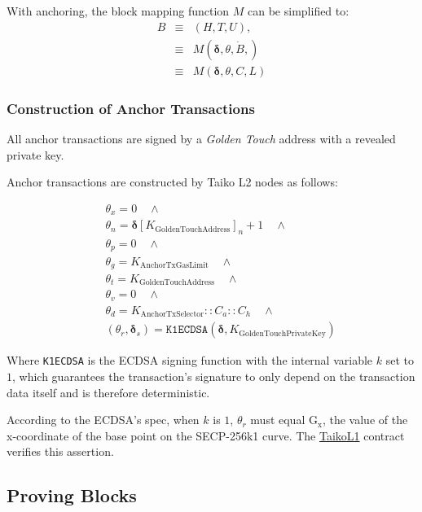 \documentclass[9pt,oneside]{amsart}
\begin{document}
\begin{multicols}{2}
With anchoring, the block mapping function $M$ can be simplified to:
\begin{eqnarray}
B & \equiv & (H, T, U), \\
\nonumber & \equiv &  M(\boldsymbol{\delta}, \theta, \dot{B}, )  \\
\nonumber & \equiv & M(\boldsymbol{\delta},  \theta, C, L)
\end{eqnarray}

\subsubsection{Construction of Anchor Transactions} All anchor transactions are signed by a \textit{Golden Touch} address with a revealed private key. 

Anchor transactions are constructed by Taiko L2 nodes as follows:

\begin{eqnarray}
& & \theta_x = 0 \quad \wedge \\
\nonumber& & \theta_n = \boldsymbol{\delta}[K_{\mathrm{GoldenTouchAddress}}]_n + 1 \quad \wedge \\
\nonumber& & \theta_p = 0 \quad \wedge \\
\nonumber& & \theta_g = K_{\mathrm{AnchorTxGasLimit}} \quad \wedge \\
\nonumber& & \theta_t = K_{\mathrm{GoldenTouchAddress}} \quad \wedge  \\
\nonumber& & \theta_v = 0 \quad \wedge  \\
\nonumber& & \theta_d = K_{\mathrm{AnchorTxSelector}}::C_a::C_h \quad \wedge  \\
\nonumber& & (\theta_r,\boldsymbol{\delta}_s) = \texttt{K1ECDSA}(\boldsymbol{\delta}, K_{\mathrm{GoldenTouchPrivateKey}})
\end{eqnarray}

Where \texttt{K1ECDSA} is the ECDSA\cite{ecdsa} signing function with the internal variable $k$ set to $1$, which guarantees the transaction's signature to only depend on the transaction data itself and is therefore deterministic.

According to the ECDSA's spec, when $k$ is $1$, $\theta_r$ must equal $\mathrm{G_x}$, the value of the x-coordinate of the base point on the SECP-256k1 curve. The \underline{TaikoL1} contract verifies this assertion.

\subsection{Proving Blocks} \label{sec:proving}


\end{multicols}
\end{document}

